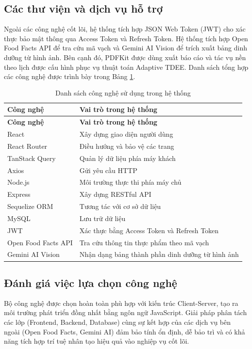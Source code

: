 \documentclass[12pt, a4paper]{report}
\begin{document}
\subsection{Các thư viện và dịch vụ hỗ trợ}
Ngoài các công nghệ cốt lõi, hệ thống tích hợp JSON Web Token (JWT) cho xác thực bảo mật thông qua Access Token và Refresh Token. Hệ thống tích hợp Open Food Facts API để tra cứu mã vạch và Gemini AI Vision để trích xuất bảng dinh dưỡng từ hình ảnh. Bên cạnh đó, PDFKit được dùng xuất báo cáo và tác vụ nền theo lịch được cấu hình phục vụ thuật toán Adaptive TDEE. Danh sách tổng hợp các công nghệ được trình bày trong Bảng \ref{tab:cong_nghe_su_dung}.

\begin{longtable}{|>{\raggedright\arraybackslash}p{5cm}|p{10cm}|}
\caption{Danh sách công nghệ sử dụng trong hệ thống}
\label{tab:cong_nghe_su_dung} \\
\hline
\textbf{Công nghệ} & \textbf{Vai trò trong hệ thống} \\
\hline
\endfirsthead
\hline
\textbf{Công nghệ} & \textbf{Vai trò trong hệ thống} \\
\hline
\endhead

React & Xây dựng giao diện người dùng \\
\hline
React Router & Điều hướng và bảo vệ các trang \\
\hline
TanStack Query & Quản lý dữ liệu phía máy khách \\
\hline
Axios & Gửi yêu cầu HTTP \\
\hline
Node.js & Môi trường thực thi phía máy chủ \\
\hline
Express & Xây dựng RESTful API \\
\hline
Sequelize ORM & Tương tác với cơ sở dữ liệu \\
\hline
MySQL & Lưu trữ dữ liệu \\
\hline
JWT & Xác thực bằng Access Token và Refresh Token \\
\hline
Open Food Facts API & Tra cứu thông tin thực phẩm theo mã vạch \\
\hline
Gemini AI Vision & Nhận dạng bảng thành phần dinh dưỡng từ hình ảnh \\
\hline
\end{longtable}

\subsection{Đánh giá việc lựa chọn công nghệ}
Bộ công nghệ được chọn hoàn toàn phù hợp với kiến trúc Client-Server, tạo ra môi trường phát triển đồng nhất bằng ngôn ngữ JavaScript. Giải pháp phân tách các lớp (Frontend, Backend, Database) cùng sự kết hợp của các dịch vụ bên ngoài (Open Food Facts, Gemini AI) đảm bảo tính ổn định, dễ bảo trì và có khả năng tích hợp trí tuệ nhân tạo hiệu quả vào nghiệp vụ cốt lõi.
\end{document}
